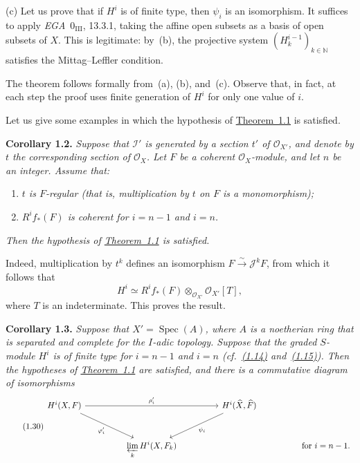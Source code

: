 \documentclass[11pt,a4paper,oneside]{book}
\theoremstyle{plain}
\theoremstyle{definition}
\theoremstyle{remark}
\begin{document}
\noindent\textup{(c)} Let us prove that if $H^i$ is of finite type, then
$\psi_i$ is an isomorphism. It suffices to apply \emph{EGA}~$0_{\mathrm{III}}$,
13.3.1, taking the affine open subsets as a basis of open subsets of $X$.
This is legitimate: by~(b), the projective system
$(H_k^{i-1})_{k\in\mathbb N}$ satisfies the Mittag--Leffler condition.

The theorem follows formally from~(a), (b), and~(c). Observe that, in fact, at
each step the proof uses finite generation of $H^i$ for only one value of $i$.

Let us give some examples in which the hypothesis of \hyperref[IX.1.1]{Theorem~1.1} is satisfied.

\medskip
{}\noindent\textbf{Corollary 1.2.}\quad
\emph{Suppose that $\mathcal I'$ is generated by a section $t'$ of
$\mathcal O_{X'}$, and denote by $t$ the corresponding section of
$\mathcal O_X$. Let $F$ be a coherent $\mathcal O_X$-module, and let $n$ be
an integer. Assume that:}
\begin{enumerate}
\item[(i)] \emph{$t$ is $F$-regular (that is, multiplication by $t$ on $F$
is a monomorphism);}
\item[(ii)] \emph{$R^i f_*(F)$ is coherent for $i=n-1$ and $i=n$.}
\end{enumerate}
\emph{Then the hypothesis of \hyperref[IX.1.1]{Theorem~1.1} is satisfied.}

Indeed, multiplication by $t^k$ defines an isomorphism
$F\xrightarrow{\sim}\mathcal J^kF$, from which it follows that
\begin{equation}
\tag{1.29}\label{eq:IX.1.29}
H^i\simeq R^i f_*(F)\otimes_{\mathcal O_{X'}}\mathcal O_{X'}[T],
\end{equation}
where $T$ is an indeterminate. This proves the result.

\noindent\textbf{Corollary 1.3.}\quad
\emph{Suppose that $X'=\operatorname{Spec}(A)$, where $A$ is a noetherian ring
that is separated and complete for the $I$-adic topology. Suppose that the
graded $S$-module $H^i$ is of finite type for $i=n-1$ and $i=n$
(cf.~\hyperref[eq:IX.1.14]{(1.14)} and~\hyperref[eq:IX.1.15]{(1.15)}). Then the hypotheses of \hyperref[IX.1.1]{Theorem~1.1} are satisfied, and
there is a commutative diagram of isomorphisms}
\begin{equation}
\tag{1.30}\label{eq:IX.1.30}
\begin{tikzcd}[column sep=4.6em,row sep=3.0em]
H^i(X,F)
  \arrow[rr,"\rho_i'"]
  \arrow[dr,"\varphi_i'"']
&& H^i(\widehat X,\widehat F)
  \arrow[dl,"\psi_i"] \\
& \displaystyle\varprojlim_k H^i(X,F_k)
&& \text{for }i=n-1.
\end{tikzcd}
\end{equation}
\end{document}
